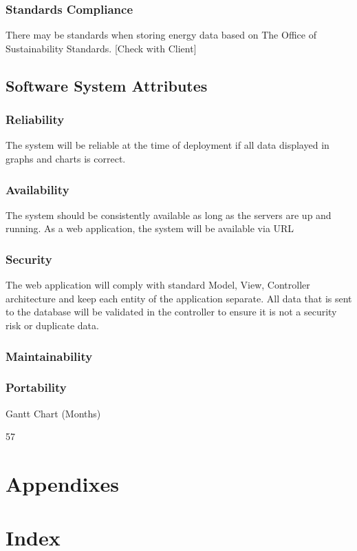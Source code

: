 \documentclass[onecolumn, draftclsnofoot,10pt, compsoc]{IEEEtran}
\begin{document}
    \subsubsection{Standards Compliance}
    There may be standards when storing energy data based on The Office of Sustainability Standards.
    [Check with Client]

    \subsection{Software System Attributes}
    
    \subsubsection{Reliability}
    The system will be reliable at the time of deployment if all data displayed in graphs and charts is correct.\\
    \subsubsection{Availability}
    The system should be consistently available as long as the servers are up and running. As a web application, the system will be available via URL 
    \subsubsection{Security}
    The web application will comply with standard Model, View, Controller architecture and keep each entity of the application separate. All data that is sent to the database will be validated in the controller to ensure it is not a security risk or duplicate data.\\
    \subsubsection{Maintainability}
    
    \subsubsection{Portability}

    Gantt Chart (Months)\\
    
    \begin{PstGanttChart}[yunit=2,ChartUnitIntervalName=Month,
        TaskUnitIntervalValue=15,TaskUnitType=Month,
        ChartShowIntervals]{5}{7}
    \end{PstGanttChart}

    \section{Appendixes}
    \section{Index}
    
    
\end{document}
